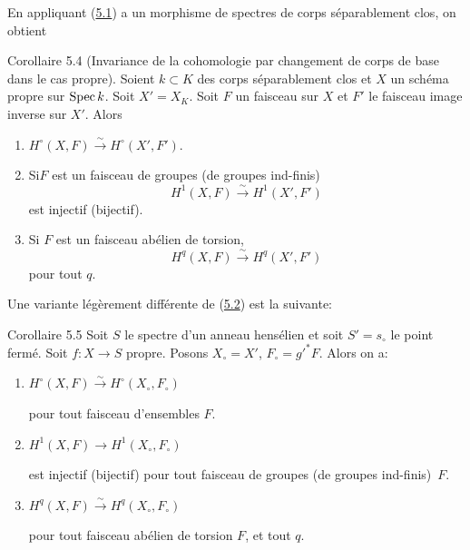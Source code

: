 \documentclass[10pt]{../fichiers-configuration-latex/smfart}
\begin{document}
En appliquant (\hyperref[XII.thm5.1]{5.1}) a un morphisme de spectres de corps séparablement
clos, on obtient

\begin{enonce*}{Corollaire 5.4}
(Invariance de la cohomologie par changement de corps de base dans le
  cas propre). Soient $k\subset K$ des corps séparablement clos et $X$
  un schéma propre sur $\operatorname{Spec} k$. Soit $X'=X_K$. Soit $F$ un faisceau
  sur $X$ et $F'$ le faisceau image inverse sur $X'$. Alors
\begin{enumerate}
\renewcommand{\theenumi}{\roman{enumi}}
\renewcommand{\labelenumi}{(\theenumi)}
\item $H^{\circ}(X,F)\xrightarrow{\sim} H^{\circ}(X',F')$.

\item Si\pageoriginale $F$ est un faisceau de groupes (\resp de
  groupes ind-finis)
$$
H^1(X,F)\xrightarrow{\sim} H^1(X',F')
$$
est injectif (\resp bijectif).

\item Si $F$ est un faisceau abélien de torsion,
$$
H^q(X,F)\xrightarrow{\sim} H^q(X',F')
$$
pour tout $q$.
\end{enumerate}
\end{enonce*}

Une variante légèrement différente de (\hyperref[XII.cor5.2]{5.2}) est la suivante:

\begin{enonce*}{Corollaire 5.5}
Soit $S$ le spectre d'un anneau hensélien et soit $S'=s_{\circ}$ le
point fermé. Soit $f:X\rightarrow S$ propre. Posons $X_{\circ}=X'$,
$F_{\circ}={g'}^{\ast}F$. Alors on a:
\begin{enumerate}
\renewcommand{\theenumi}{\roman{enumi}}
\renewcommand{\labelenumi}{(\theenumi)}
\item $H^{\circ}(X,F)\xrightarrow{\sim}
  H^{\circ}(X_{\circ},F_{\circ})$

pour tout faisceau d'ensembles $F$.

\item $H^1(X,F)\rightarrow H^1(X_{\circ},F_{\circ})$

est injectif (\resp bijectif) pour tout faisceau de groupes (\resp de
groupes ind-finis)~$F$.

\item $H^q(X,F)\xrightarrow{\sim} H^q(X_{\circ},F_{\circ})$

pour tout faisceau abélien de torsion $F$, et tout $q$.
\end{enumerate}
\end{enonce*}
\end{document}
